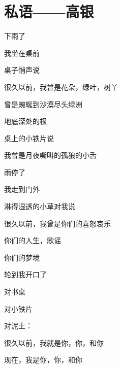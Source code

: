 \section{私语——高银}

下雨了

我坐在桌前

桌子悄声说

很久以前，我曾是花朵，绿叶，树丫

曾是蜿蜒到沙漠尽头绿洲

地底深处的根

桌上的小铁片说

我曾是月夜嘶叫的孤狼的小舌

雨停了

我走到门外

淋得湿透的小草对我说

很久以前，我曾是你们的喜怒哀乐

你们的人生，歌谣

你们的梦境

轮到我开口了

对书桌

对小铁片

对泥土：

很久以前，我就是你，你，和你

现在，我是你，你，和你
